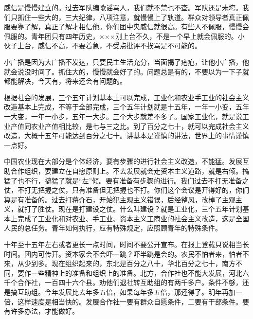 威信是慢慢建立的。过去军队编歌谣骂人，我们就不禁也不查。军队还是未垮。我们只抓住一些大的，三大纪律，八项注意，就慢慢上了轨道。群众对领导者真正佩服要靠了解，真正了解才相信他。你们团中央威信就很高。有些人不佩服，慢慢会佩服的。青年团只有四年历史，×××刚上台不久，不是一个早上就会佩服的。小伙子上台，威信不高，不要着急，不受点批评不挨骂是不可能的。

小广播是因为大广播不发达，只要民主生活充分，当面揭了疮疤，让他小广播，他就会说没时间了。抓住大的，慢慢就会好了的。问题总是有的，不要以为一下子就都能解决，今天有，将来还会有问题的。

根据社会的发展，三个五年计划基本上可以完成，工业化和农业手工业的社会主义改造基本上完成，不等于全部完成，三个五年计划就是十五年，一年一小变，五年一大变，一年一小步，五年一大步。三个大步就差不多了。国家工业化，就是说工业产值同农业产值相比较，是七与三之比。到了百分之七十，就可以完成社会主义改造，大概十五年可能达到百分之七十。讲基本是谨慎的讲法，世界上的事情谨慎一点好。

中国农业现在大部分是个体经济，要有步骤的进行社会主义改造，不能猛。发展互助合作组织，要建立在自愿原则上。不去发展就会走资本主义道路，就是右倾。搞猛了也不行，搞猛了就是“左”倾。要有准备有步骤的进行。我们过去不打无准备之仗，不打无把握之仗，只有准备但无把握也不打。你们这个会议是开得好的，你们算是有准备的。过去打蒋介石，开始犯主观主义错误，后经整风，改棹了主观主义，就打了胜仗。现在是打建设之仗。什么叫建设？就是工业化，三个五年计划基本上完成了工业化和对农业、手工业、资本主义工商业的社会主义改造，这是全国人民的总任务。青年如何执行，应有特殊规定，应照顾青年的特殊条件。

十年至十五年左右或者更长一点时间，时间不要公开宣布。在报上登载只说相当长时间。团内可传开。资本家会不会吓一跳？吓半跳是会的。农民不怕者来，怕者不来，从少到多。现在组织起来的，东北是百分之八十，华北百分之七十，南方不同，要作一些精神上的准备和组织上的准备。北方，合作社也不能大发展，河北六千个合作社，一百四十六个县。劝他们退社转互助组的有两千多户。条件不够，还是搞互助组。今年发展比去年多五倍，如果每年多五倍，那还得了。明年再加一倍，这样速度是相当快的。发展合作社一要有群众自愿条件，二要有干部条件。要有许多办法，才能做好。


